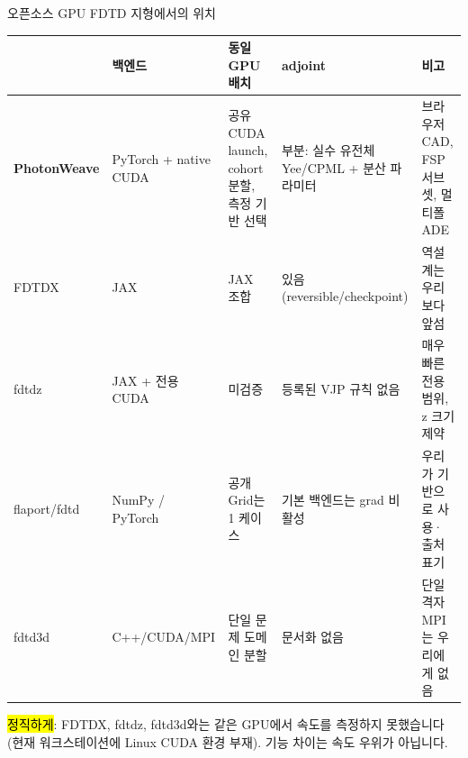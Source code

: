 \documentclass[aspectratio=169,11pt]{beamer}
\begin{document}
\begin{frame}{오픈소스 GPU FDTD 지형에서의 위치}
  \begin{center}\scriptsize
    \begin{tabular}{l p{2.2cm} p{2.6cm} p{2.4cm} p{2.4cm}}
      \toprule
      & \textbf{백엔드} & \textbf{동일 GPU 배치} & \textbf{adjoint} & \textbf{비고} \\
      \midrule
      \textbf{PhotonWeave} & PyTorch + native CUDA & 공유 CUDA launch, cohort 분할, 측정 기반 선택 & 부분: 실수 유전체 Yee/CPML + 분산 파라미터 & 브라우저 CAD, FSP 서브셋, 멀티폴 ADE \\
      FDTDX & JAX & JAX 조합 & \textcolor{pwgreen}{있음} (reversible/checkpoint) & \textcolor{pwred}{역설계는 우리보다 앞섬} \\
      fdtdz & JAX + 전용 CUDA & 미검증 & 등록된 VJP 규칙 없음 & 매우 빠른 전용 범위, z 크기 제약 \\
      flaport/fdtd & NumPy / PyTorch & 공개 Grid는 1 케이스 & 기본 백엔드는 grad 비활성 & 우리가 기반으로 사용·출처 표기 \\
      fdtd3d & C++/CUDA/MPI & 단일 문제 도메인 분할 & 문서화 없음 & \textcolor{pwred}{단일 격자 MPI는 우리에게 없음} \\
      \bottomrule
    \end{tabular}
  \end{center}
  \vspace{2mm}
  \footnotesize
  \hl{정직하게}: FDTDX, fdtdz, fdtd3d와는 같은 GPU에서 속도를 측정하지 못했습니다(현재 워크스테이션에 Linux CUDA 환경 부재).
  기능 차이는 속도 우위가 아닙니다.
\end{frame}
\end{document}
